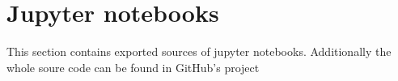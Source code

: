 \chapter{Jupyter notebooks}
\label{app:netcdf}
This section contains exported sources of jupyter notebooks. Additionally the whole soure code can be found in GitHub's project \cite{github}



